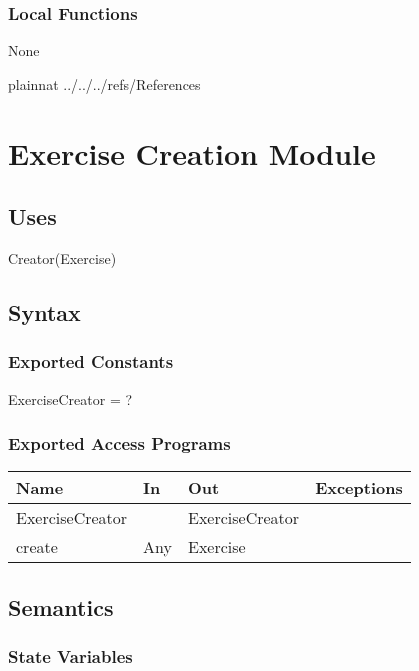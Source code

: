 \documentclass[12pt, titlepage]{article}
\begin{document}
\subsubsection{Local Functions}

None

\newpage

 {plainnat}
 {../../../refs/References}

\newpage
\section{Exercise Creation Module}

\subsection{Uses}

Creator(Exercise)

\subsection{Syntax}

\subsubsection{Exported Constants}

ExerciseCreator = ?

\subsubsection{Exported Access Programs}

\begin{center}
	\begin{tabular}{p{2cm} p{4cm} p{4cm} p{2cm}}
		\hline
		\textbf{Name} & \textbf{In} & \textbf{Out} & \textbf{Exceptions} \\
		\hline
		ExerciseCreator &  & ExerciseCreator &  \\
		create & Any & Exercise &  \\
		\hline
	\end{tabular}
\end{center}

\subsection{Semantics}

\subsubsection{State Variables}
\end{document}
